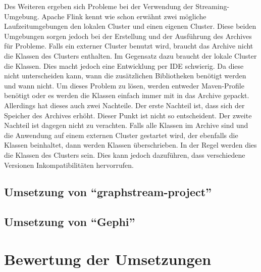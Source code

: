 Des Weiteren ergeben sich Probleme bei der Verwendung der Streaming-Umgebung.
Apache Flink kennt wie schon erwähnt zwei mögliche Laufzeitumgebungen den lokalen
Cluster und einen eigenen Cluster. Diese beiden Umgebungen sorgen jedoch bei
der Erstellung und der Ausführung des Archives für Probleme. Falls ein externer
Cluster benutzt wird, braucht das Archive nicht die Klassen des Clusters
enthalten. Im Gegensatz dazu braucht der lokale Cluster die Klassen. Dies macht
jedoch eine Entwicklung per \gls{IDE} schwierig. Da diese nicht unterscheiden
kann, wann die zusätzlichen Bibliotheken benötigt werden und wann nicht. Um
dieses Problem zu lösen, werden entweder Maven-Profile benötigt oder es werden
die Klassen einfach immer mit in das Archive gepackt. Allerdings hat dieses auch
zwei Nachteile. Der erste Nachteil ist, dass sich der Speicher des Archives
erhöht. Dieser Punkt ist nicht so entscheident. Der zweite Nachteil ist dagegen
nicht zu verachten. Falls alle Klassen im Archive sind und die Anwendung auf
einem externen Cluster gestartet wird, der ebenfalls die Klassen beinhaltet,
dann werden Klassen überschrieben. In der Regel werden dies die Klassen des
Clusters sein. Dies kann jedoch dazuführen, dass verschiedene Versionen
Inkompatibilitäten hervorrufen.

\subsection{Umsetzung von \enquote{graphstream-project}}
\subsection{Umsetzung von \enquote{Gephi}}
\section{Bewertung der Umsetzungen}
